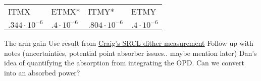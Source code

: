 \centering
    
        \begin{tabular}{ |p{1.5cm}|p{1.5cm}|p{1.5cm}|p{1.5cm}| }
        \hline
        ITMX & ETMX* & ITMY* & ETMY \\
        $.344\cdot10^{-6}$ & $.4\cdot10^{-6}$ & $.804\cdot10^{-6}$ & $.4\cdot10^{-6}$\\
        \hline
        \end{tabular}
 \begin{outline}
    \1 The arm gain 
        \2 Use result from \href{https://alog.ligo-wa.caltech.edu/aLOG/index.php?callRep=46683}{Craig's SRCL dither measurement}
    \1 Follow up with notes (uncertainties, potential point absorber issues.. maybe mention later)
    \1 Dan's idea of quantifying the absorption from integrating the OPD. Can we convert into an absorbed power?
 \end{outline}